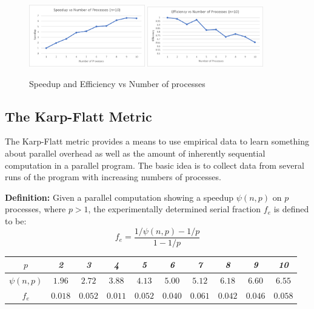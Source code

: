 \documentclass{article}
\begin{document}
\begin{figure}[ht]
	\centering
    \includegraphics[width=0.45\textwidth]{speedup.png}\quad
    \includegraphics[width=0.45\textwidth]{efficiency.png}\quad
    \caption{Speedup and Efficiency vs Number of processes}
    \label{fig:speed_eff}
\end{figure}

\subsection{The Karp-Flatt Metric}

\medskip
\noindent
The Karp-Flatt metric provides a means to use empirical data to learn something 
about parallel overhead as well as the amount of inherently sequential 
computation in a parallel program. The basic idea is to collect data from 
several runs of the program with increasing numbers of processes.

\medskip
\noindent
\textbf{Definition:} Given a parallel computation showing a speedup $\psi(n, p)$
on $p$ processes, where $p > 1$, the experimentally determined serial fraction 
$f_e$ is defined to be: 
\[f_e = \frac{1/\psi(n, p) - 1/p}{1 - 1/p}\]

\begin{table}[ht]
\centering
\begin{tabular}{|c|c|c|c|c|c|c|c|c|c|}
\hline
$p$ & \textit{2}  & \textit{3}  & \textit{4}  & \textit{5} & \textit{6}  
    & \textit{7}  & \textit{8}  & \textit{9} & \textit{10} \\ \hline

$\psi(n, p)$ & $1.96$  & $2.72$ & $3.88$ & $4.13$ & $5.00$ 
             & $5.12$  & $6.18$ & $6.60$ & $6.55$  \\ \hline

$f_e$ & $0.018$  & $0.052$ & $ 0.011$ & $ 0.052$ & $0.040$ 
      & $0.061$  & $0.042$ & $0.046$  & $0.058$ \\ \hline
\end{tabular}
\end{table}
\end{document}
